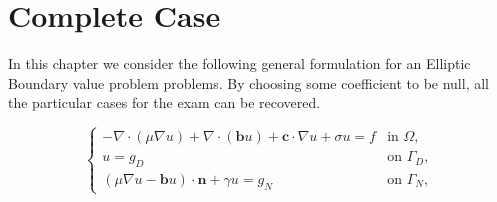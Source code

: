 \documentclass[11pt]{book}
\begin{document}











\section{Complete Case}
In this chapter we consider the following general formulation for an Elliptic Boundary value problem problems. By choosing some coefficient to be null, all the particular cases for the exam can be recovered.

\begin{equation}
\begin{cases}
-\nabla \cdot (\mu \nabla u) + \nabla \cdot (\mathbf{b}u)+\mathbf{c} \cdot \nabla u +  \sigma u = f & \text{in } \Omega, \\
u = g_D & \text{on } \Gamma_D, \\
(\mu \nabla u - \mathbf{b}u) \cdot \mathbf{n} + \gamma u = g_N & \text{on } \Gamma_N,
\end{cases}
\end{equation}
    
\end{document}
